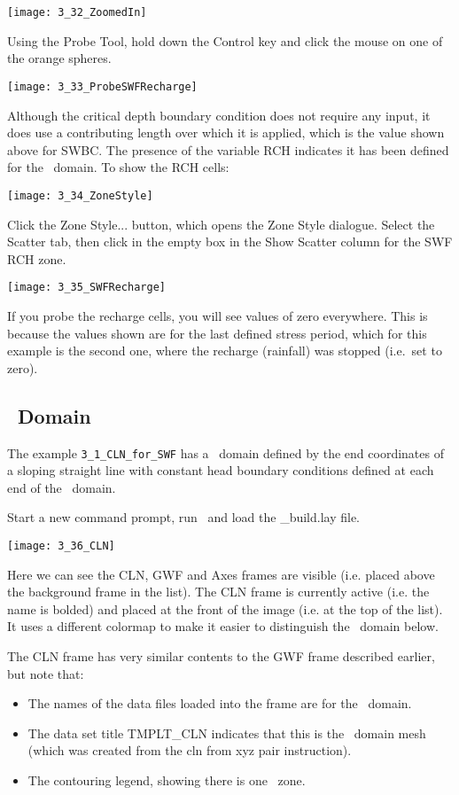         \texttt{[image: 3\_32\_ZoomedIn]}

Using the {\sf Probe Tool}, hold down the {\sf Control} key and click the mouse on one of the orange spheres.

        \texttt{[image: 3\_33\_ProbeSWFRecharge]}

Although the critical depth boundary condition does not require any input, it does use a contributing length over which it is applied, which is the value shown above for {\sf SWBC}.  The presence of the variable {\sf RCH} indicates it has been defined for the \swf\ domain.  To show the {\sf RCH} cells:

        \texttt{[image: 3\_34\_ZoneStyle]}

Click the {\sf Zone Style...} button, which opens the {\sf Zone Style} dialogue.  Select the {\sf Scatter} tab, then click in the empty box in the {\sf Show Scatter} column for the {\sf SWF RCH} zone.

        \texttt{[image: 3\_35\_SWFRecharge]}

If you probe the recharge cells, you will see values of zero everywhere.  This is because the values shown are for the last defined stress period, which for this example is the second one, where the recharge (rainfall) was stopped (i.e.\ set to zero).

\subsection{\cln\ Domain}
The example \texttt{3\_1\_CLN\_for\_SWF} has a \cln\ domain defined by the end coordinates of a sloping straight line  with constant head boundary conditions defined at each end of the \gwf\ domain.

Start a new command prompt, run \tecplot\ and load the {\sf \_build.lay} file.

        \texttt{[image: 3\_36\_CLN]}

Here we can see the {\sf CLN,  GWF} and {\sf Axes} frames are visible (i.e. placed above the {\sf background} frame in the list).  The {\sf CLN} frame is currently active (i.e. the name is bolded) and placed at the front of the image (i.e. at the top of the list). It uses a different colormap to make it easier to distinguish the \gwf\ domain below.

The {\sf CLN} frame has very similar contents to the {\sf GWF} frame described earlier, but note that:
\begin{itemize}
  \item The names of the data files loaded into the frame are for the \cln\ domain.
  \item   The data set title {\sf TMPLT\_CLN} indicates that this is the \cln\ domain mesh (which was created from the {\sf cln from xyz pair} instruction).
  \item The contouring legend, showing there is one \cln\ zone. \end{itemize}

